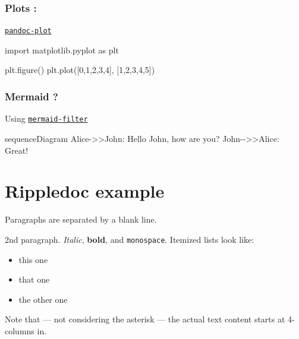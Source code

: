 \documentclass[
]{tufte-pandoc}
\newenvironment{Shaded}{}{}
\newcommand{\NormalTok}[1]{#1}
\providecommand{\tightlist}{%
  \setlength{\itemsep}{0pt}\setlength{\parskip}{0pt}}
\begin{document}
\hypertarget{plots}{%
\subsubsection{Plots :}\label{plots}}

\href{https://github.com/LaurentRDC/pandoc-plot}{\texttt{pandoc-plot}}

\hypertarget{fig:plot}{%
\label{fig:plot}}%
\begin{Shaded}
\begin{Highlighting}[]
\NormalTok{import matplotlib.pyplot as plt}

\NormalTok{plt.figure()}
\NormalTok{plt.plot([0,1,2,3,4], [1,2,3,4,5])}
\end{Highlighting}
\end{Shaded}

\hypertarget{mermaid}{%
\subsubsection{Mermaid ?}\label{mermaid}}

Using
\href{https://github.com/raghur/mermaid-filter}{\texttt{mermaid-filter}}

\begin{Shaded}
\begin{Highlighting}[]
\NormalTok{sequenceDiagram}
\NormalTok{    Alice{-}\textgreater{}\textgreater{}John: Hello John, how are you?}
\NormalTok{    John{-}{-}\textgreater{}\textgreater{}Alice: Great!}
\end{Highlighting}
\end{Shaded}

\hypertarget{rippledoc-example}{%
\section{Rippledoc example}\label{rippledoc-example}}

Paragraphs are separated by a blank line.

2nd paragraph. \emph{Italic}, \textbf{bold}, and \texttt{monospace}.
Itemized lists look like:

\begin{itemize}
\tightlist
\item
  this one
\item
  that one
\item
  the other one
\end{itemize}

Note that --- not considering the asterisk --- the actual text content
starts at 4-columns in.
\end{document}
